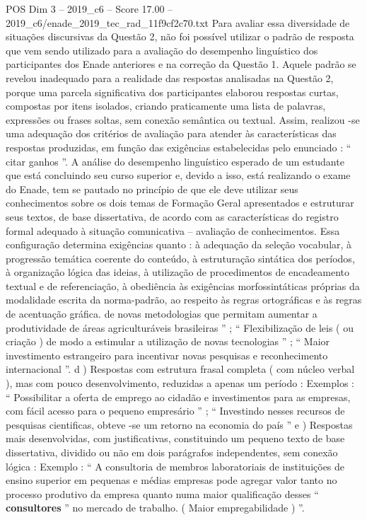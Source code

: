 \begin{textsample}{POS Dim 3 – 2019\_c6 – Score 17.00 – 2019\_c6/enade\_2019\_tec\_rad\_11f9cf2c70.txt}
Para avaliar essa diversidade de situações discursivas da Questão 2, não foi possível utilizar o padrão de resposta que vem sendo utilizado para a avaliação do desempenho linguístico dos participantes dos Enade anteriores e na correção da Questão 1.
Aquele padrão se revelou inadequado para a realidade das respostas analisadas na Questão 2, porque uma parcela significativa dos participantes elaborou respostas curtas, compostas por itens isolados, criando praticamente uma lista de palavras, expressões ou frases soltas, sem conexão semântica ou textual.
Assim, realizou -se uma adequação dos critérios de avaliação para atender às características das respostas produzidas, em função das exigências estabelecidas pelo enunciado : “ citar ganhos ”.
A análise do desempenho linguístico esperado de um estudante que está concluindo seu curso superior e, devido a isso, está realizando o exame do Enade, tem se pautado no princípio de que ele deve utilizar seus conhecimentos sobre os dois temas de Formação Geral apresentados e estruturar seus textos, de base dissertativa, de acordo com as características do registro formal adequado à situação comunicativa – avaliação de conhecimentos.
Essa configuração determina exigências quanto : à adequação da seleção vocabular, à progressão temática coerente do conteúdo, à estruturação sintática dos períodos, à organização lógica das ideias, à utilização de procedimentos de encadeamento textual e de referenciação, à obediência às exigências morfossintáticas próprias da modalidade escrita da norma-padrão, ao respeito às regras ortográficas e às regras de acentuação gráfica. de novas metodologias que permitam aumentar a produtividade de áreas agriculturáveis brasileiras ” ; “ Flexibilização de leis ( ou criação ) de modo a estimular a utilização de novas tecnologias ” ; “ Maior investimento estrangeiro para incentivar novas pesquisas e reconhecimento internacional ”. d ) Respostas com estrutura frasal completa ( com núcleo verbal ), mas com pouco desenvolvimento, reduzidas a apenas um período : Exemplos : “ Possibilitar a oferta de emprego ao cidadão e investimentos para as empresas, com fácil acesso para o pequeno empresário ” ; “ Investindo nesses recursos de pesquisas cientificas, obteve -se um retorno na economia do país ” e ) Respostas mais desenvolvidas, com justificativas, constituindo um pequeno texto de base dissertativa, dividido ou não em dois parágrafos independentes, sem conexão lógica : Exemplo : “ A consultoria de membros laboratoriais de instituições de ensino superior em pequenas e médias empresas pode agregar valor tanto no processo produtivo da empresa quanto numa maior qualificação desses “ \textbf{consultores} ” no mercado de trabalho. ( Maior empregabilidade ) ”.

\end{textsample}

